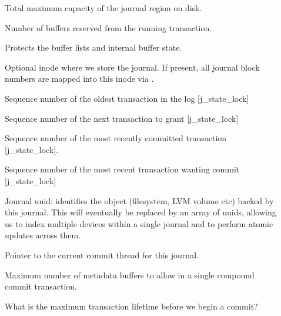 \documentclass[a4paper,8pt,english]{sphinxmanual}
\begin{document}
\begin{description}
\item[{}] \leavevmode
Total maximum capacity of the journal region on disk.

\item[{}] \leavevmode
Number of buffers reserved from the running transaction.

\item[{}] \leavevmode
Protects the buffer lists and internal buffer state.

\item[{}] \leavevmode
Optional inode where we store the journal.  If present, all
journal block numbers are mapped into this inode via {\hyperref[filesystems/index:c.bmap]{\emph{}}}.

\item[{}] \leavevmode
Sequence number of the oldest transaction in the log {[}j\_state\_lock{]}

\item[{}] \leavevmode
Sequence number of the next transaction to grant {[}j\_state\_lock{]}

\item[{}] \leavevmode
Sequence number of the most recently committed transaction
{[}j\_state\_lock{]}.

\item[{}] \leavevmode
Sequence number of the most recent transaction wanting commit
{[}j\_state\_lock{]}

\item[{}] \leavevmode
Journal uuid: identifies the object (filesystem, LVM volume etc)
backed by this journal.  This will eventually be replaced by an array
of uuids, allowing us to index multiple devices within a single
journal and to perform atomic updates across them.

\item[{}] \leavevmode
Pointer to the current commit thread for this journal.

\item[{}] \leavevmode
Maximum number of metadata buffers to allow in a single compound
commit transaction.

\item[{}] \leavevmode
What is the maximum transaction lifetime before we begin a commit?


\end{description}
\end{document}
